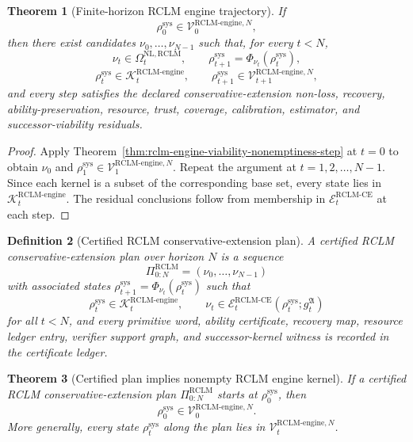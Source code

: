 \documentclass[11pt,a4paper]{article}
\newtheorem{theorem}{Theorem}[section]
\newtheorem{definition}[theorem]{Definition}
\newcommand{\Kcal}{\mathcal K}
\newcommand{\Vcal}{\mathcal V}
\newcommand{\RCLM}{\mathrm{RCLM}}
\newcommand{\sys}{\mathrm{sys}}
\newcommand{\engine}{\mathrm{engine}}
\newcommand{\NL}{\mathrm{NL}}
\newcommand{\CE}{\mathrm{CE}}
\begin{document}
\begin{theorem}[Finite-horizon RCLM engine trajectory]
\label{thm:rclm-finite-engine-trajectory}
If
\[
\rho_0^{\sys}\in\Vcal_0^{\RCLM\text{-}\engine,N},
\]
then there exist candidates \(\nu_0,\ldots,\nu_{N-1}\) such that, for every \(t<N\),
\[
\nu_t\in\Omega_t^{\NL,\RCLM},
\qquad
\rho_{t+1}^{\sys}=\Phi_{\nu_t}(\rho_t^{\sys}),
\]
\[
\rho_t^{\sys}\in\Kcal_t^{\RCLM\text{-}\engine},
\qquad
\rho_{t+1}^{\sys}\in\Vcal_{t+1}^{\RCLM\text{-}\engine,N},
\]
and every step satisfies the declared conservative-extension non-loss, recovery, ability-preservation, resource, trust, coverage, calibration, estimator, and successor-viability residuals.
\end{theorem}

\begin{proof}
Apply Theorem~\ref{thm:rclm-engine-viability-nonemptiness-step} at \(t=0\) to obtain \(\nu_0\) and \(\rho_1^{\sys}\in\Vcal_1^{\RCLM\text{-}\engine,N}\).  Repeat the argument at \(t=1,2,\ldots,N-1\).  Since each kernel is a subset of the corresponding base set, every state lies in \(\Kcal_t^{\RCLM\text{-}\engine}\).  The residual conclusions follow from membership in \(\mathcal E_t^{\RCLM\text{-}\CE}\) at each step.
\end{proof}

\begin{definition}[Certified RCLM conservative-extension plan]
\label{def:rclm-certified-ce-plan}
A certified RCLM conservative-extension plan over horizon \(N\) is a sequence
\[
\Pi_{0:N}^{\RCLM}=(\nu_0,\ldots,\nu_{N-1})
\]
with associated states \(\rho_{t+1}^{\sys}=\Phi_{\nu_t}(\rho_t^{\sys})\) such that
\[
\rho_t^{\sys}\in\Kcal_t^{\RCLM\text{-}\engine},
\qquad
\nu_t\in\mathcal E_t^{\RCLM\text{-}\CE}(\rho_t^{\sys};g_t^{\mathfrak A})
\]
for all \(t<N\), and every primitive word, ability certificate, recovery map, resource ledger entry, verifier support graph, and successor-kernel witness is recorded in the certificate ledger.
\end{definition}

\begin{theorem}[Certified plan implies nonempty RCLM engine kernel]
\label{thm:rclm-certified-plan-implies-kernel-nonempty}
If a certified RCLM conservative-extension plan \(\Pi_{0:N}^{\RCLM}\) starts at \(\rho_0^{\sys}\), then
\[
\rho_0^{\sys}\in\Vcal_0^{\RCLM\text{-}\engine,N}.
\]
More generally, every state \(\rho_t^{\sys}\) along the plan lies in \(\Vcal_t^{\RCLM\text{-}\engine,N}\).
\end{theorem}
\end{document}

